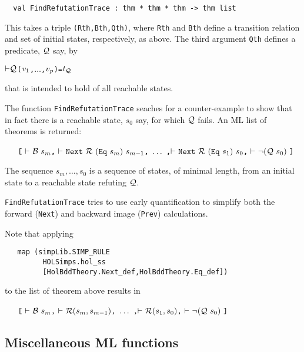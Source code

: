 \documentclass[12pt]{article}
\newcommand{\bnind}[1]{\index[MLbn]{#1}}
\renewcommand{\t}[1]{\mbox{\tt #1}}
\newcommand{\ml}[1]{{\tt #1}}
\newcommand\turn{{\vdash}}
\begin{document}
\begin{verbatim}
  val FindRefutationTrace : thm * thm * thm -> thm list
\end{verbatim}\bnind{\ml{FindRefutationTrace}}

This takes a triple \t{(Rth,Bth,Qth)}, where \t{Rth} and \t{Bth} define
a transition relation and set of initial states, respectively, as
above. The third argument \t{Qth} defines a predicate, ${\cal Q}$ say,
by


\begin{alltt}
   \(\turn {\cal{Q}}\)(\(v\sb{1}\),\(\ldots\),\(v\sb{p}\)) = \(t\sb{\cal{Q}}\)
\end{alltt}

that is intended to hold of all reachable states. 

The function \t{FindRefutationTrace} seaches for a counter-example to
show that in fact there is a reachable state, $s_0$ say, for which ${\cal Q}$
fails. An ML list of theorems is returned:

\smallskip

~~~$\t{[}~\turn~{\cal{B}}~s_m\t{,}~\turn~\t{Next}~{\cal{R}}~(\t{Eq}~s_m)~s_{m-1}\t{,}~\ldots~\t{,}
       \turn~\t{Next}~{\cal{R}}~(\t{Eq}~s_1)~s_0\t{,}~\turn~\neg({\cal{Q}}~s_0)~\t{]}$

\smallskip

The sequence $s_m,\ldots,s_0$ is a sequence of states, of minimal length, from an initial state
to a reachable state refuting ${\cal{Q}}$.


\t{FindRefutationTrace} tries to use early quantification to simplify
both the forward (\t{Next}) and backward image (\t{Prev})
calculations.


Note that applying 

\begin{verbatim}
   map (simpLib.SIMP_RULE 
         HOLSimps.hol_ss
         [HolBddTheory.Next_def,HolBddTheory.Eq_def])
\end{verbatim}

to the list of theorem above results in


\smallskip

~~~$\t{[}~\turn~{\cal{B}}~s_m\t{,}~\turn~{\cal{R}}(s_m,s_{m-1})\t{,}~\ldots~\t{,}
       \turn~{\cal{R}}(s_1,s_0)\t{,}~\turn~\neg({\cal{Q}}~s_0)~\t{]}$

\smallskip

\subsection{Miscellaneous ML functions}\label{StateEnumMisc}
\end{document}
